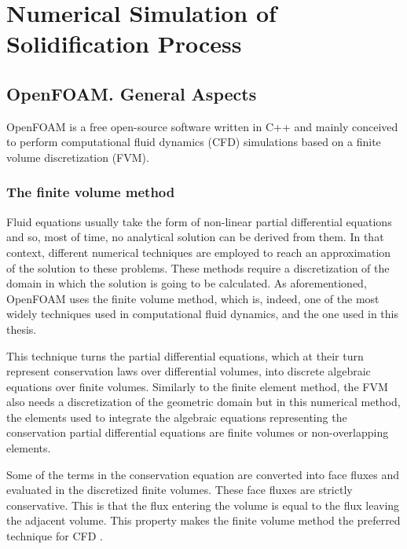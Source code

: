 
\chapter{Numerical Simulation of Solidification Process} %

\label{Chapter3} %
\section{OpenFOAM. General Aspects}

\setlength{\parindent}{0.5cm} OpenFOAM is a free open-source software written in C++ and mainly conceived to perform computational fluid dynamics (CFD) simulations based on a finite volume discretization (FVM). 

\subsection{The finite volume method}

\setlength{\parindent}{0.5cm} Fluid equations usually take the form of non-linear partial differential equations and so, most of time, no analytical solution can be derived from them. In that context, different numerical techniques are employed to reach an approximation of the solution to these problems. These methods require a discretization of the domain in which the solution is going to be calculated. As aforementioned, OpenFOAM uses the finite volume method, which is, indeed, one of the most widely techniques used in computational fluid dynamics, and the one used in this thesis.

\noindent This technique turns the partial differential equations, which at their turn represent conservation laws over differential volumes, into discrete algebraic equations over finite volumes. Similarly to the finite element method, the FVM also needs a discretization of the geometric domain but in this numerical method, the elements used to integrate the algebraic equations representing the conservation partial differential equations are finite volumes or non-overlapping elements.

\noindent Some of the terms in the conservation equation are converted into face fluxes and evaluated in the discretized finite volumes. These face fluxes are strictly conservative. This is that the flux entering the volume is equal to the flux leaving the adjacent volume. This property makes the finite volume method the preferred technique for CFD \cite{moukalled_mangani_darwish_2016}. 

